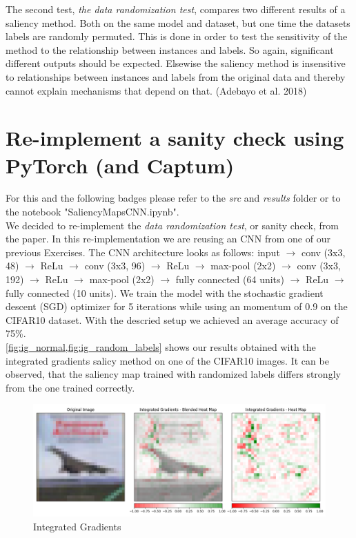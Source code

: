 \documentclass{article}
\begin{document}
The second test, \textit{the data randomization test}, compares two different results of a saliency method. Both on the same model and dataset, but one time the datasets labels are randomly permuted. This is done in order to test the sensitivity of the method to the relationship between instances and labels. So again, significant different outputs should be expected. Elsewise the saliency method is insensitive to relationships between instances and labels from the original data and thereby cannot explain mechanisms that depend on that. (Adebayo et al. 2018) \par

\section{Re-implement a sanity check using PyTorch (and Captum)}
For this and the following badges please refer to the \textit{src} and \textit{results} folder or to the notebook "SaliencyMapsCNN.ipynb".\\

We decided to re-implement the \textit{data randomization test}, or sanity check, from the paper. In this re-implementation we are reusing an CNN from one of our previous Exercises. The CNN architecture looks as follows: input $\to$ conv (3x3, 48) $\to$ ReLu $\to$ conv (3x3, 96) $\to$ ReLu $\to$ max-pool (2x2) $\to$ conv (3x3, 192) $\to$ ReLu $\to$ max-pool (2x2) $\to$ fully connected (64 units) $\to$ ReLu $\to$ fully connected (10 units). We train the model with the stochastic gradient descent (SGD) optimizer for 5 iterations while using an momentum of 0.9 on the CIFAR10 dataset. With the descried setup we achieved an average accuracy of 75\%.\\

\cref{fig:ig_normal,fig:ig_random_labels} shows our results obtained with the integrated gradients salicy method on one of the CIFAR10 images. It can be observed, that the saliency map trained with randomized labels differs strongly from the one trained correctly.

\begin{figure}[h!]
\centering
\includegraphics[width=\textwidth]{results/IG_normal.png}
\caption{Integrated Gradients}
\label{fig:ig_normal}
\end{figure}
\end{document}
